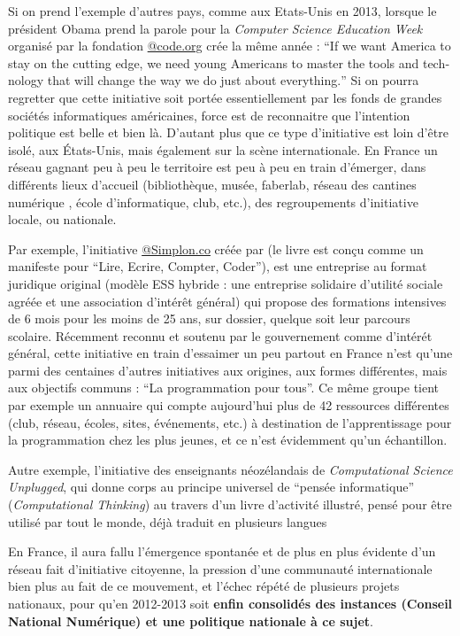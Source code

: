 Si on prend l'exemple d'autres pays, comme aux Etats-Unis en 2013, lorsque le président Obama prend la parole pour la \textit{Computer Science Education Week} organisé par la fondation \href{http://code.org}{@code.org} crée la même année : \foreignquote{english}{If we want America to stay on the cutting edge, we need young Americans to master the tools and technology that will change the way we do just about everything.} Si on pourra regretter que cette initiative soit portée essentiellement par les fonds de grandes sociétés informatiques américaines, force est de reconnaitre que l'intention politique est belle et bien là. D'autant plus que ce type d'initiative est loin d'être isolé, aux États-Unis, mais également sur la scène internationale. En France un réseau gagnant peu à peu le territoire est peu à peu en train d'émerger, dans différents lieux d'accueil (bibliothèque, musée, faberlab, réseau des cantines numérique , école d'informatique, club, etc.), des regroupements d'initiative locale, ou nationale.

Par exemple, l'initiative \href{http://Simplon.co}{@Simplon.co}  créée par \textcite{Bardeau2014} (le livre est conçu comme un manifeste pour \enquote{Lire, Ecrire, Compter, Coder}), est une entreprise au format juridique original (modèle ESS hybride : une entreprise solidaire d’utilité sociale agréée et une association d’intérêt général) qui propose des formations intensives de 6 mois pour les moins de 25 ans, sur dossier, quelque soit leur parcours scolaire. Récemment reconnu et soutenu par le gouvernement comme d'intérét général, cette initiative en train d'essaimer un peu partout en France n'est qu'une parmi des centaines d'autres initiatives aux origines, aux formes différentes, mais aux objectifs communs : \enquote{La programmation pour tous}. Ce même groupe tient par exemple un annuaire \autocite{Simplon2015} qui compte aujourd'hui plus de 42 ressources différentes (club, réseau, écoles, sites, événements, etc.) à destination de l'apprentissage pour la programmation chez les plus jeunes, et ce n'est évidemment qu'un échantillon.

Autre exemple, l'initiative des enseignants néozélandais de \textit{Computational Science Unplugged}, qui donne corps au principe universel de \enquote{pensée informatique} (\textit{Computational Thinking}) au travers d'un livre d'activité illustré, pensé pour être utilisé par tout le monde, déjà traduit en plusieurs langues 

En France, il aura fallu l'émergence spontanée et de plus en plus évidente d'un réseau fait d'initiative citoyenne, la pression d'une communauté internationale bien plus au fait de ce mouvement, et l'échec répété de plusieurs projets nationaux, pour qu'en 2012-2013 soit \textbf{ enfin consolidés des instances (Conseil National Numérique) et une politique nationale à ce sujet}.

